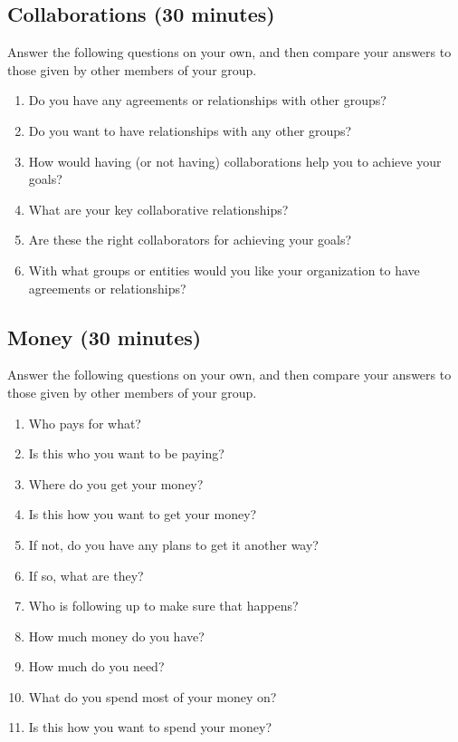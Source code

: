 \documentclass[10pt,statementpaper]{memoir}
\providecommand{\tightlist}{%
  \setlength{\itemsep}{0pt}\setlength{\parskip}{0pt}}
\begin{document}
\subsection*{Collaborations (30
minutes)}\label{collaborations-30-minutes}

Answer the following questions on your own, and then compare your
answers to those given by other members of your group.

\begin{enumerate}
\def\labelenumi{\arabic{enumi}.}
\tightlist
\item
  Do you have any agreements or relationships with other groups?
\item
  Do you want to have relationships with any other groups?
\item
  How would having (or not having) collaborations help you to achieve
  your goals?
\item
  What are your key collaborative relationships?
\item
  Are these the right collaborators for achieving your goals?
\item
  With what groups or entities would you like your organization to have
  agreements or relationships?
\end{enumerate}

\subsection*{Money (30 minutes)}\label{money-30-minutes}

Answer the following questions on your own, and then compare your
answers to those given by other members of your group.

\begin{enumerate}
\def\labelenumi{\arabic{enumi}.}
\tightlist
\item
  Who pays for what?
\item
  Is this who you want to be paying?
\item
  Where do you get your money?
\item
  Is this how you want to get your money?
\item
  If not, do you have any plans to get it another way?
\item
  If so, what are they?
\item
  Who is following up to make sure that happens?
\item
  How much money do you have?
\item
  How much do you need?
\item
  What do you spend most of your money on?
\item
  Is this how you want to spend your money?
\end{enumerate}
\end{document}
